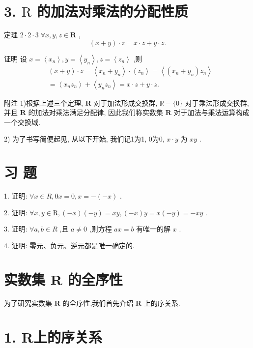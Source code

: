 \section*{3. $\mathrm{R}$ 的加法对乘法的分配性质}

定理 $2 \cdot  2 \cdot  3\;\forall x,y,z \in  \mathbf{R}$ ,
$$\left( {x + y}\right)  \cdot  z = x \cdot  z + y \cdot  z.$$

证明 设 $x = \left\langle  {x}_{n}\right\rangle  ,y = \left\langle  {y}_{n}\right\rangle  ,z = \left\langle  {z}_{n}\right\rangle$ ,则
\begin{align*}
	&\left( {x + y}\right)  \cdot  z = \left\langle  {{x}_{n} + {y}_{n}}\right\rangle   \cdot  \left\langle  {z}_{n}\right\rangle   = \left\langle  {\left( {{x}_{n} + {y}_{n}}\right) {z}_{n}}\right\rangle\\
	&= \left\langle  {{x}_{n}{z}_{n}}\right\rangle   + \left\langle  {{y}_{n}{z}_{n}}\right\rangle   = x \cdot  z + y \cdot  z.
\end{align*}

附注 1)根据上述三个定理, $\mathbf{R}$ 对于加法形成交换群, $\mathbb{R} - \{ 0\}$ 对于乘法形成交换群,并且 $\mathbf{R}$ 的加法对乘法满足分配律, 因此我们称实数集 $\mathbf{R}$ 对于加法与乘法运算构成一个交换域.

2) 为了书写简便起见, 从以下开始, 我们记1为1, 0为0, $x \cdot  y$ 为 ${xy}$ .

\section*{习 题}

1. 证明: $\forall x \in  R,{0x} = 0,x =  - \left( {-x}\right)$ .

2. 证明: $\forall x,y \in  \mathrm{R},\left( {-x}\right) \left( {-y}\right)  = {xy},\left( {-x}\right) y = x\left( {-y}\right)  =  - {xy}$ .

3. 证明: $\forall a,b \in  R$ ,且 $a \neq  0$ ,则方程 ${ax} = b$ 有唯一的解 $x$ .

4. 证明: 零元、负元、逆元都是唯一确定的.

\section{实数集 $\mathbf{R}$ 的全序性}

为了研究实数集 $\mathbf{R}$ 的全序性,我们首先介绍 $\mathbf{R}$ 上的序关系.

\section*{1. R上的序关系}

